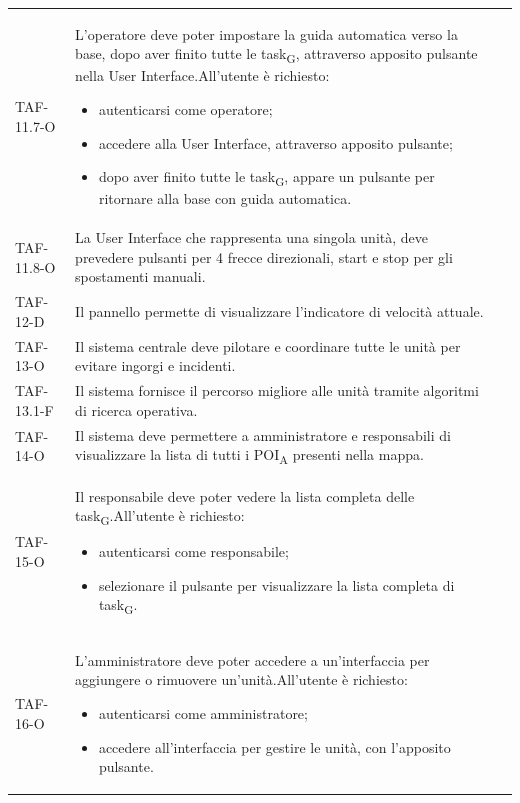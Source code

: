 \begin{longtable}{ >{\centering}p{} >{}p{}
		>{\centering}p{}}
	TAF-11.7-O & L'operatore deve poter impostare la guida automatica verso la base, dopo aver finito tutte le \gls{task}\textsubscript{G}, attraverso apposito pulsante nella User Interface.\newline All'utente è richiesto: \begin{itemize} \item autenticarsi come operatore; \item accedere alla User Interface, attraverso apposito pulsante; \item dopo aver finito tutte le \gls{task}\textsubscript{G}, appare un pulsante per ritornare alla base con guida automatica.\end{itemize} & 0\tabularnewline
	
	TAF-11.8-O & La User Interface che rappresenta una singola unità, deve prevedere pulsanti per 4 frecce direzionali, start e stop per gli spostamenti manuali. & 0\tabularnewline
	
	TAF-12-D & Il pannello permette di visualizzare l'indicatore di velocità attuale. & 0\tabularnewline
	
	TAF-13-O & Il sistema centrale deve pilotare e coordinare tutte le unità per evitare ingorgi e incidenti. & 0\tabularnewline
	
	TAF-13.1-F & Il sistema fornisce il percorso migliore alle unità tramite algoritmi di ricerca operativa. & 0\tabularnewline
	
	TAF-14-O & Il sistema deve permettere a amministratore e responsabili di visualizzare la lista di tutti i \acrshort{POI}\textsubscript{A} presenti nella mappa. & 0\tabularnewline
	
	TAF-15-O & Il responsabile deve poter vedere la lista completa delle \gls{task}\textsubscript{G}.\newline All'utente è richiesto:\begin{itemize} \item autenticarsi come responsabile; \item selezionare il pulsante per visualizzare la lista completa di \gls{task}\textsubscript{G}. \end{itemize} & 0\tabularnewline
	
	TAF-16-O & L'amministratore deve poter accedere a un'interfaccia per aggiungere o rimuovere un'unità.\newline All'utente è richiesto: \begin{itemize} \item autenticarsi come amministratore; \item accedere all'interfaccia per gestire le unità, con l'apposito pulsante.\end{itemize} & 0\tabularnewline
	

\end{longtable}
